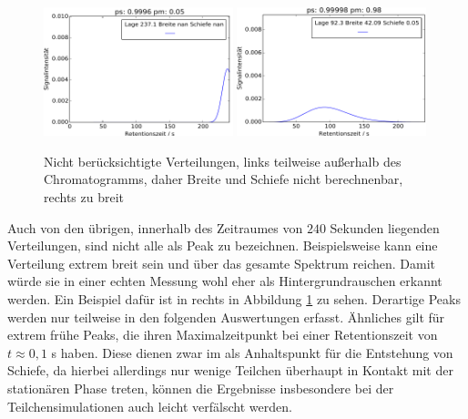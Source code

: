 \begin{figure}[H]
\includegraphics[width=0.49\textwidth]{bilder/outof240}
\includegraphics[width=0.49\textwidth]{bilder/huegel}
\caption[Nicht berücksichtigte Verteilungen]{Nicht berücksichtigte Verteilungen, links teilweise außerhalb des Chromatogramms, daher Breite und Schiefe nicht berechnenbar, rechts zu breit}
\label{kein_peak}
\end{figure}


Auch von den übrigen, innerhalb des Zeitraumes von $240$ Sekunden liegenden Verteilungen, sind nicht alle als Peak zu bezeichnen. Beispielsweise kann eine Verteilung extrem breit sein und über das gesamte Spektrum reichen. Damit würde sie in einer echten Messung wohl eher als Hintergrundrauschen erkannt werden. Ein Beispiel dafür ist in rechts in Abbildung \ref{kein_peak} zu sehen. Derartige Peaks werden nur teilweise in den folgenden Auswertungen erfasst.
Ähnliches gilt für extrem frühe Peaks, die ihren Maximalzeitpunkt bei einer Retentionszeit von $t \approx 0,1$ s haben. Diese dienen zwar im als Anhaltspunkt für die Entstehung von Schiefe, da hierbei allerdings nur wenige Teilchen überhaupt in Kontakt mit der stationären Phase treten, können die Ergebnisse insbesondere bei der Teilchensimulationen auch leicht verfälscht werden.

